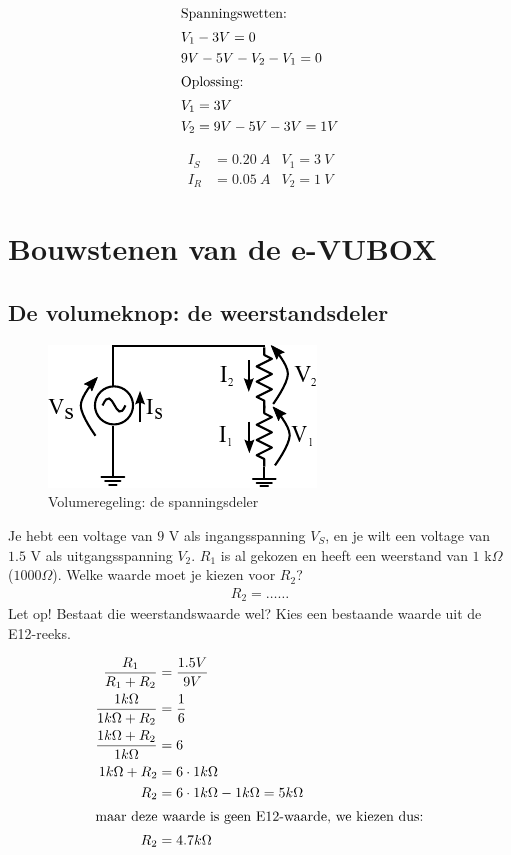 \documentclass{exam}
\begin{document}
\begin{questions}
\begin{solutionordottedlines}[2in]
				\begin{align*}
					\intertext{Spanningswetten:}
					&V_1-3V = 0 \\
					&9V-5V-V_2-V_1 = 0 \\
					\intertext{Oplossing:}
					&V_1 = 3V \\
					&V_2 = 9V-5V-3V = 1V
				\end{align*}

				\begin{align*}
					I_S &= 0.20~A & V_1 = 3~V\\
					I_R &= 0.05~A  & V_2 =1~V 
				\end{align*}
			\end{solutionordottedlines}

\section{Bouwstenen van de e-VUBOX}
\subsection{De volumeknop: de weerstandsdeler}
		\question
			\begin{figure}[htbp]
				\centering
				\includegraphics{weerstandsdeler}
				\caption{Volumeregeling: de spanningsdeler}
				\label{fig:volume}
			\end{figure}
			Je hebt een voltage van $9$ V als ingangsspanning $V_S$, en je wilt een voltage van $1.5$ V als uitgangsspanning $V_2$. $R_1$ is al gekozen en heeft een weerstand van $1$ k$\Omega$ ($1000 \Omega$). Welke waarde moet je kiezen voor $R_2$?
				\begin{align*}
				    R_2 = \ldots\ldots
				\end{align*}
				Let op! Bestaat die weerstandswaarde wel? Kies een bestaande waarde uit de E12-reeks.

			\begin{solutionordottedlines}[1in]
					\begin{align}
					    \frac{R_1}{R_1+R_2} &= \frac{1.5V}{9V} \\
					    \frac{1 k\Omega}{1k\Omega + R_2} &= \frac{1}{6}\\
					    \frac{1k\Omega + R_2}{1 k\Omega} &= 6\\
					    1k\Omega + R_2 &= 6 \cdot 1k\Omega\\
					    R_2 &= 6 \cdot 1 k\Omega - 1 k\Omega =  5 k\Omega  \\
					    \intertext{maar deze waarde is geen E12-waarde, we kiezen dus:}
					    R_2 &= 4.7 k\Omega
					\end{align}
			\end{solutionordottedlines}


\end{questions}
\end{document}

